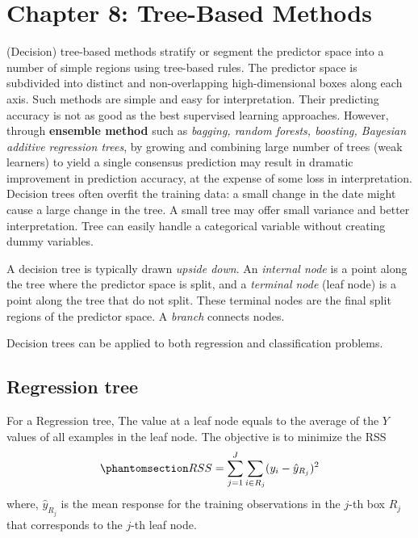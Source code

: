 \documentclass[
  letterpaper,
  DIV=11,
  numbers=noendperiod]{scrreprt}
\begin{document}

\chapter{Chapter 8: Tree-Based
Methods}\label{chapter-8-tree-based-methods}

(Decision) tree-based methods stratify or segment the predictor space
into a number of simple regions using tree-based rules. The predictor
space is subdivided into distinct and non-overlapping high-dimensional
boxes along each axis. Such methods are simple and easy for
interpretation. Their predicting accuracy is not as good as the best
supervised learning approaches. However, through \textbf{ensemble
method} such as \emph{bagging, random forests, boosting, Bayesian
additive regression trees}, by growing and combining large number of
trees (weak learners) to yield a single consensus prediction may result
in dramatic improvement in prediction accuracy, at the expense of some
loss in interpretation. Decision trees often overfit the training data:
a small change in the date might cause a large change in the tree. A
small tree may offer small variance and better interpretation. Tree can
easily handle a categorical variable without creating dummy variables.

A decision tree is typically drawn \emph{upside down}. An \emph{internal
node} is a point along the tree where the predictor space is split, and
a \emph{terminal node} (leaf node) is a point along the tree that do not
split. These terminal nodes are the final split regions of the predictor
space. A \emph{branch} connects nodes.

Decision trees can be applied to both regression and classification
problems.

\section{Regression tree}\label{regression-tree}

For a Regression tree, The value at a leaf node equals to the average of
the \(Y\) values of all examples in the leaf node. The objective is to
minimize the RSS
\begin{equation}\phantomsection\label{eq-tree-objective}{
RSS =\sum_{j=1}^J \sum_{i\in R_j}(y_i-\hat{y}_{R_j})^2
}\end{equation} where, \(\hat{y}_{R_j}\) is the mean response for the
training observations in the \(j\)-th box \(R_j\) that corresponds to
the \(j\)-th leaf node.
\end{document}
